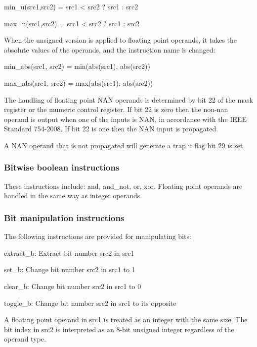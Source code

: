 \documentclass[forwardcom.tex]{subfiles}
\begin{document}
min\_u(src1,src2) = src1 \textless{} src2 ? src1 : src2

max\_u(src1,src2) = src1 \textless{} src2 ? src1 : src2
\vspace{2mm}

When the unsigned version is applied to floating point operands, it takes the absolute values of the operands, and the instruction name is changed:
\vspace{2mm}

min\_abs(src1, src2) = min(abs(src1), abs(src2))

max\_abs(src1, src2) = max(abs(src1), abs(src2))
\vspace{2mm}

The handling of floating point NAN operands is determined by bit 22 of the mask register or the mumeric control register. If bit 22 is zero then the non-nan operand is output when one of the inputs is NAN, in accordance with the IEEE Standard 754-2008. If bit 22 is one then the NAN input is propagated.
\vspace{2mm}

A NAN operand that is not propagated will generate a trap if flag bit 29 is set.

\subsubsection{Bitwise boolean instructions}
These instructions include: and, and\_not, or, xor. Floating point operands are handled in the same way as integer operands.

\subsubsection{Bit manipulation instructions}
The following instructions are provided for manipulating bits: 
\vspace{2mm}

extract\_b: Extract bit number src2 in src1

set\_b: Change bit number src2 in src1 to 1

clear\_b: Change bit number src2 in src1 to 0

toggle\_b: Change bit number src2 in src1 to its opposite
\vspace{2mm}

A floating point operand in src1 is treated as an integer with the same size. The bit index in src2 is interpreted as an 8-bit unsigned integer regardless of the operand type.
\vspace{2mm}
\end{document}
